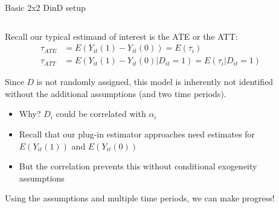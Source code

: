 \documentclass[notes,11pt, aspectratio=169]{beamer}
\newenvironment{wideitemize}{\itemize\addtolength{\itemsep}{10pt}}{\enditemize}
\begin{document}
\begin{frame}{Basic 2x2 DinD setup}
  \begin{columns}[T] %
    \begin{column}{0.8\textwidth}
      \begin{wideitemize}
      \item Recall our typical estimand of interest is the ATE or the ATT:
        \begin{align*}
          \tau_{ATE} &= E(Y_{it}(1) - Y_{it}(0)) = E(\tau_{i})\\
          \tau_{ATT} &= E(Y_{it}(1) - Y_{it}(0) | D_{it} = 1) = E(\tau_{i} |D_{it} = 1)          
        \end{align*}
      \item Since $D$ is not randomly assigned, this model is inherently not identified without the additional assumptions (and two time periods).
        \begin{itemize}
        \item Why? $D_{i}$ could be correlated with $\alpha_{i}$
        \item Recall that our plug-in estimator approaches need
          estimates for $E(Y_{it}(1))$ and $E(Y_{it}(0))$
        \item But the correlation prevents this without conditional exogeneity assumptions
        \end{itemize}
      \item Using the assumptions and multiple time periods, we can make progress!
      \end{wideitemize}
    \end{column}%
    \hfill%
    \begin{column}{.45\textwidth}
    \end{column}%
  \end{columns}
\end{frame}
\end{document}
